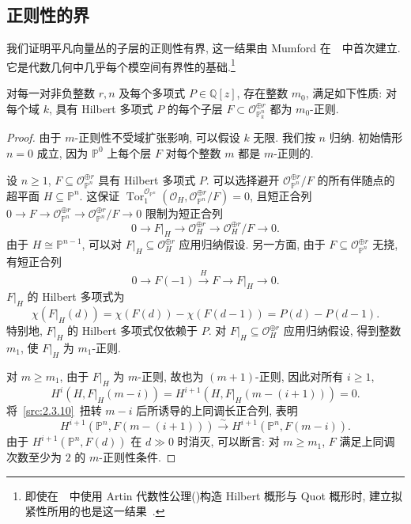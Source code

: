 \subsection{正则性的界}\label{src:2.3.2-subsection}
我们证明平凡向量丛的子层的正则性有界, 这一结果由 Mumford 在~\cite[第 $101$ 页]{Mum66a}~中首次建立.
它是代数几何中几乎每个模空间有界性的基础.\footnote{即使在~\cite[Tag 0DPA]{SP}~中使用 Artin 代数性公理()构造 Hilbert 概形与 Quot 概形时, 建立拟紧性所用的也是这一结果~\cite[Tag 08AG]{SP}.}
\begin{theorem}[正则性的有界性]\label{src:2.3.8}
对每一对非负整数 $r,n$ 及每个多项式 $P\in\mathbb Q[z]$, 存在整数 $m_0$, 满足如下性质: 对每个域 $k$, 具有 Hilbert 多项式 $P$ 的每个子层 $F\subset\mathcal O_{\mathbb P_k^n}^{\oplus r}$ 都为 $m_0$-正则.
\end{theorem}
\begin{proof}
由于 $m$-正则性不受域扩张影响, 可以假设 $k$ 无限.
我们按 $n$ 归纳. 初始情形 $n=0$ 成立, 因为 $\mathbb P^0$ 上每个层 $F$ 对每个整数 $m$ 都是 $m$-正则的.

设 $n\geq1$, $F\subseteq\mathcal O_{\mathbb P^n}^{\oplus r}$ 具有 Hilbert 多项式 $P$.
可以选择避开 $\mathcal O_{\mathbb P^n}^{\oplus r}/F$ 的所有伴随点的超平面 $H\subseteq\mathbb P^n$.
这保证
$\operatorname{Tor}^{\mathcal O_{\mathbb P^n}}_1
(\mathcal O_H,\mathcal O_{\mathbb P^n}^{\oplus r}/F)=0$, 
且短正合列 $0\to F\to\mathcal O_{\mathbb P^n}^{\oplus r}\to\mathcal O_{\mathbb P^n}^{\oplus r}/F\to0$
限制为短正合列
\begin{equation}\label{src:2.3.9}
0\longrightarrow F|_H\longrightarrow\mathcal O_H^{\oplus r}
\longrightarrow\mathcal O_H^{\oplus r}/F\longrightarrow0.
\end{equation}
由于 $H\cong\mathbb P^{n-1}$, 可以对 $F|_H\subseteq\mathcal O_H^{\oplus r}$ 应用归纳假设.
另一方面, 由于 $F\subseteq\mathcal O_{\mathbb P^n}^{\oplus r}$ 无挠, 有短正合列
\begin{equation}\label{src:2.3.10}
0\longrightarrow F(-1)\xrightarrow{H}F\longrightarrow F|_H\longrightarrow0.
\end{equation}
$F|_H$ 的 Hilbert 多项式为
\[
\chi(F|_H(d))=\chi(F(d))-\chi(F(d-1))=P(d)-P(d-1).
\]
特别地, $F|_H$ 的 Hilbert 多项式仅依赖于 $P$.
对 $F|_H\subseteq\mathcal O_H^{\oplus r}$ 应用归纳假设, 得到整数 $m_1$, 使 $F|_H$ 为 $m_1$-正则.

对 $m\geq m_1$, 由于 $F|_H$ 为 $m$-正则, 故也为 $(m+1)$-正则, 因此对所有 $i\geq1$, 
\[
H^i(H,F|_H(m-i))=H^{i+1}(H,F|_H(m-(i+1)))=0.
\]
将~\eqref{src:2.3.10}~扭转 $m-i$ 后所诱导的上同调长正合列, 表明
\[
H^{i+1}(\mathbb P^n,F(m-(i+1)))
\xrightarrow{\sim}H^{i+1}(\mathbb P^n,F(m-i)).
\]
由于 $H^{i+1}(\mathbb P^n,F(d))$ 在 $d\gg0$ 时消灭, 可以断言: 对 $m\geq m_1$, $F$ 满足上同调次数至少为 $2$ 的 $m$-正则性条件.


\end{proof}
